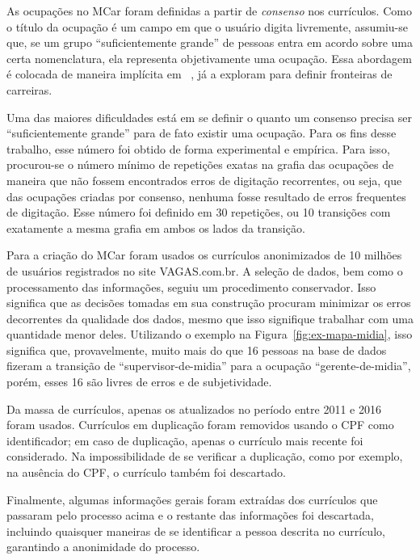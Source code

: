 \documentclass[
  article,
  11pt,
  a4paper,
  english,
  brazil,
  sumario=tradicional]{abntex2}
\begin{document}
As ocupações no MCar foram definidas a partir de \textit{consenso} nos currículos. Como o título da ocupação é um campo em que o usuário digita livremente, assumiu-se que, se um grupo \enquote{suficientemente grande} de pessoas entra em acordo sobre uma certa nomenclatura, ela representa objetivamente uma ocupação. Essa abordagem é colocada de maneira implícita em ~, já  a exploram para definir fronteiras de carreiras.

Uma das maiores dificuldades está em se definir o quanto um consenso precisa ser \enquote{suficientemente grande} para de fato existir uma ocupação. Para os fins desse trabalho, esse número foi obtido de forma experimental e empírica. Para isso, procurou-se o número mínimo de repetições exatas na grafia das ocupações de maneira que não fossem encontrados erros de digitação recorrentes, ou seja, que das ocupações criadas por consenso, nenhuma fosse resultado de erros frequentes de digitação. Esse número foi definido em 30 repetições, ou 10 transições com exatamente a mesma grafia em ambos os lados da transição.

Para a criação do MCar foram usados os currículos anonimizados de 10 milhões de usuários registrados no site VAGAS.com.br. A seleção de dados, bem como o processamento das informações, seguiu um procedimento conservador. Isso significa que as decisões tomadas em sua construção procuram minimizar os erros decorrentes da qualidade dos dados, mesmo que isso signifique trabalhar com uma quantidade menor deles. Utilizando o exemplo na Figura~\ref{fig:ex-mapa-midia}, isso significa que, provavelmente, muito mais do que 16 pessoas na base de dados fizeram a transição de \enquote{supervisor-de-midia} para a ocupação \enquote{gerente-de-midia}, porém, esses 16 são livres de erros e de subjetividade.

Da massa de currículos, apenas os atualizados no período entre 2011 e 2016 foram usados. Currículos em duplicação foram removidos usando o CPF como identificador; em caso de duplicação, apenas o currículo mais recente foi considerado. Na impossibilidade de se verificar a duplicação, como por exemplo, na ausência do CPF, o currículo também foi descartado.

Finalmente, algumas informações gerais foram extraídas dos currículos que passaram pelo processo acima e o restante das informações foi descartada, incluindo quaisquer maneiras de se identificar a pessoa descrita no currículo, garantindo a anonimidade do processo.
\end{document}
